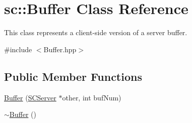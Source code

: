 \hypertarget{classsc_1_1Buffer}{\section{sc\-:\-:Buffer Class Reference}
\label{classsc_1_1Buffer}
}


This class represents a client-\/side version of a server buffer.  




{\ttfamily \#include $<$Buffer.\-hpp$>$}

\subsection*{Public Member Functions}
\begin{DoxyCompactItemize}
\item 
\hyperlink{classsc_1_1Buffer_aa461325a96603e78a79561e90ce5f394}{Buffer} (\hyperlink{classsc_1_1SCServer}{S\-C\-Server} $\ast$other, int buf\-Num)
\item 
\hypertarget{classsc_1_1Buffer_ab9ef17039f271262d3c3dbc979cdc85d}{\hyperlink{classsc_1_1Buffer_ab9ef17039f271262d3c3dbc979cdc85d}{$\sim$\-Buffer} ()}\label{classsc_1_1Buffer_ab9ef17039f271262d3c3dbc979cdc85d}


\end{DoxyCompactItemize}
